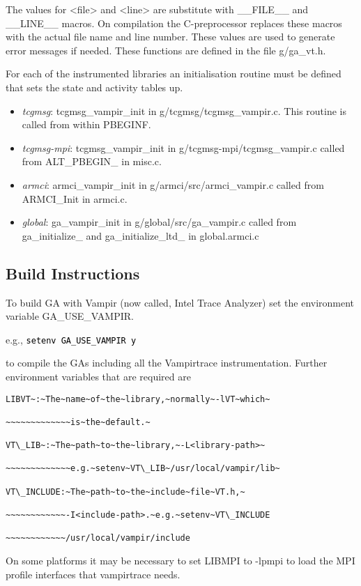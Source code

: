 The values for <file> and <line> are substitute with \_\_FILE\_\_
and \_\_LINE\_\_ macros. On compilation the C-preprocessor replaces
these macros with the actual file name and line number. These values
are used to generate error messages if needed. These functions are
defined in the file g/ga\_vt.h.

For each of the instrumented libraries an initialisation routine must
be defined that sets the state and activity tables up.
\begin{itemize}
\item \emph{tcgmsg}: tcgmsg\_vampir\_init in g/tcgmsg/tcgmsg\_vampir.c.
This routine is called from within PBEGINF. 
\item \emph{tcgmsg-mpi}: tcgmsg\_vampir\_init in g/tcgmsg-mpi/tcgmsg\_vampir.c
called from ALT\_PBEGIN\_ in misc.c. 
\item \emph{armci}: armci\_vampir\_init in g/armci/src/armci\_vampir.c called
from ARMCI\_Init in armci.c. 
\item \emph{global}: ga\_vampir\_init in g/global/src/ga\_vampir.c called
from ga\_initialize\_ and ga\_initialize\_ltd\_ in global.armci.c
\end{itemize}

\subsection{Build Instructions }

To build GA with Vampir (now called, Intel Trace Analyzer) set the
environment variable GA\_USE\_VAMPIR.

e.g., \texttt{\textcolor{black}{setenv GA\_USE\_VAMPIR y}}

to compile the GAs including all the Vampirtrace instrumentation.
Further environment variables that are required are
\begin{verbatim}
LIBVT~:~The~name~of~the~library,~normally~-lVT~which~

~~~~~~~~~~~~~is~the~default.~

VT\_LIB~:~The~path~to~the~library,~-L<library-path>~

~~~~~~~~~~~~~e.g.~setenv~VT\_LIB~/usr/local/vampir/lib~

VT\_INCLUDE:~The~path~to~the~include~file~VT.h,~

~~~~~~~~~~~~-I<include-path>.~e.g.~setenv~VT\_INCLUDE

~~~~~~~~~~~~/usr/local/vampir/include
\end{verbatim}
On some platforms it may be necessary to set LIBMPI to -lpmpi to load
the MPI profile interfaces that vampirtrace needs.

